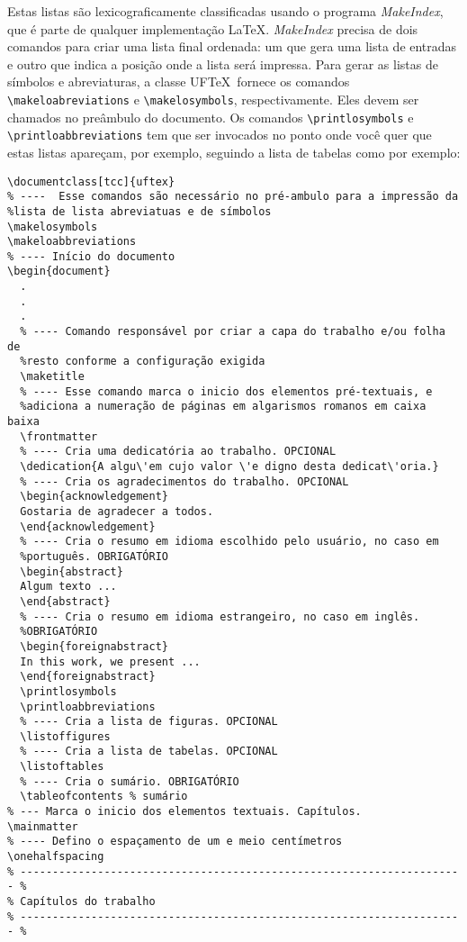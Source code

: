 \documentclass[report]{uftex}
\newcommand\uftex{UF\TeX}
\begin{document}
Estas listas são lexicograficamente classificadas usando o programa \emph{MakeIndex}, que é parte de qualquer implementação \LaTeX. \emph{MakeIndex} precisa de dois comandos para criar uma lista final ordenada: um que gera uma lista de entradas e outro que indica a posição onde a lista será impressa. Para gerar as listas de símbolos e abreviaturas, a classe \uftex\ fornece os comandos \verb+\makeloabreviations+ e \verb+\makelosymbols+, respectivamente. Eles devem ser chamados no preâmbulo do documento. Os comandos \verb+\printlosymbols+ e \verb+\printloabbreviations+ tem que ser invocados no ponto onde você quer que estas listas apareçam, por exemplo, seguindo a lista de tabelas como por exemplo:

\singlespacing
\footnotesize
\begin{verbatim}
\documentclass[tcc]{uftex}
% ----  Esse comandos são necessário no pré-ambulo para a impressão da
%lista de lista abreviatuas e de símbolos
\makelosymbols
\makeloabbreviations
% ---- Início do documento
\begin{document}
  .
  .
  .
  % ---- Comando responsável por criar a capa do trabalho e/ou folha de
  %resto conforme a configuração exigida
  \maketitle
  % ---- Esse comando marca o inicio dos elementos pré-textuais, e
  %adiciona a numeração de páginas em algarismos romanos em caixa baixa
  \frontmatter
  % ---- Cria uma dedicatória ao trabalho. OPCIONAL
  \dedication{A algu\'em cujo valor \'e digno desta dedicat\'oria.}
  % ---- Cria os agradecimentos do trabalho. OPCIONAL
  \begin{acknowledgement}
  Gostaria de agradecer a todos.
  \end{acknowledgement}
  % ---- Cria o resumo em idioma escolhido pelo usuário, no caso em
  %português. OBRIGATÓRIO
  \begin{abstract}
  Algum texto ...
  \end{abstract}
  % ---- Cria o resumo em idioma estrangeiro, no caso em inglês.
  %OBRIGATÓRIO
  \begin{foreignabstract}
  In this work, we present ...
  \end{foreignabstract}
  \printlosymbols  
  \printloabbreviations
  % ---- Cria a lista de figuras. OPCIONAL
  \listoffigures
  % ---- Cria a lista de tabelas. OPCIONAL
  \listoftables 
  % ---- Cria o sumário. OBRIGATÓRIO
  \tableofcontents % sumário
% --- Marca o inicio dos elementos textuais. Capítulos.
\mainmatter
% ---- Defino o espaçamento de um e meio centímetros
\onehalfspacing
% --------------------------------------------------------------------- %
% Capítulos do trabalho
% --------------------------------------------------------------------- %

\end{verbatim}
\end{document}
